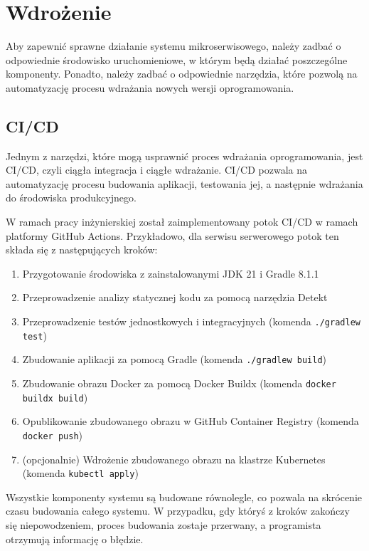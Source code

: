 \clearpage %

\section{Wdrożenie}

Aby zapewnić sprawne działanie systemu mikroserwisowego, należy zadbać o odpowiednie środowisko uruchomieniowe, w którym będą działać poszczególne komponenty. Ponadto, należy zadbać o odpowiednie narzędzia, które pozwolą na automatyzację procesu wdrażania nowych wersji oprogramowania.

\subsection{CI/CD}

Jednym z narzędzi, które mogą usprawnić proces wdrażania oprogramowania, jest CI/CD, czyli ciągła integracja i ciągłe wdrażanie. CI/CD pozwala na automatyzację procesu budowania aplikacji, testowania jej, a następnie wdrażania do środowiska produkcyjnego.

W ramach pracy inżynierskiej został zaimplementowany potok CI/CD w ramach platformy GitHub Actions. Przykładowo, dla serwisu serwerowego potok ten składa się z następujących kroków:

\begin{enumerate}
    \item Przygotowanie środowiska z zainstalowanymi JDK 21 i Gradle \cite{gradle} 8.1.1
    \item Przeprowadzenie analizy statycznej kodu za pomocą narzędzia Detekt \cite{detekt}
    \item Przeprowadzenie testów jednostkowych i integracyjnych (komenda \texttt{./gradlew test})
    \item Zbudowanie aplikacji za pomocą Gradle (komenda \texttt{./gradlew build})
    \item Zbudowanie obrazu Docker za pomocą Docker Buildx (komenda \texttt{docker buildx build})
    \item Opublikowanie zbudowanego obrazu w GitHub Container Registry \cite{ghcr} (komenda \texttt{docker push})
    \item (opcjonalnie) Wdrożenie zbudowanego obrazu na klastrze Kubernetes (komenda \texttt{kubectl apply})
\end{enumerate}

Wszystkie komponenty systemu są budowane równolegle, co pozwala na skrócenie czasu budowania całego systemu. W przypadku, gdy któryś z kroków zakończy się niepowodzeniem, proces budowania zostaje przerwany, a programista otrzymują informację o błędzie.

